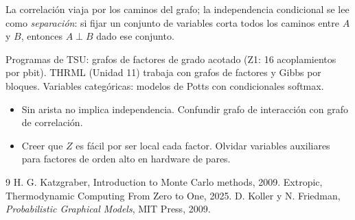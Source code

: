 \documentclass[11pt,a4paper]{article}
\begin{document}
\begin{intuicion}
La correlación viaja por los caminos del grafo; la independencia condicional se lee como \emph{separación}: si fijar un conjunto de
variables corta todos los caminos entre $A$ y $B$, entonces $A\perp B$ dado ese conjunto.
\end{intuicion}

\begin{aplicacion}
Programas de TSU: grafos de factores de grado acotado (Z1: 16 acoplamientos por pbit). THRML (Unidad 11) trabaja con grafos de factores y Gibbs
por bloques. Variables categóricas: modelos de Potts con condicionales softmax.
\end{aplicacion}

\begin{error}
\begin{itemize}[nosep]
\item Sin arista no implica independencia. \quad Confundir grafo de interacción con grafo de correlación.
\item Creer que $Z$ es fácil por ser local cada factor. \quad Olvidar variables auxiliares para factores de orden alto en hardware de pares.
\end{itemize}
\end{error}

\begin{thebibliography}{9}\small
{} H. G. Katzgraber, Introduction to Monte Carlo methods, 2009.
 Extropic, Thermodynamic Computing From Zero to One, 2025.
 D. Koller y N. Friedman, \emph{Probabilistic Graphical Models}, MIT Press, 2009.
\end{thebibliography}
\end{document}

